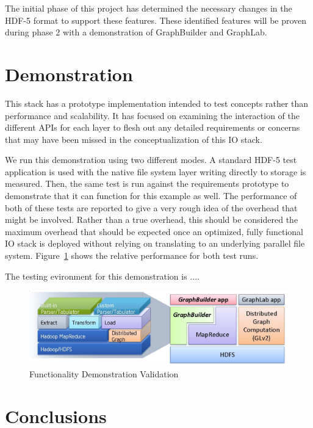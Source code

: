 \documentclass[conference]{IEEEtran}
\begin{document}
The initial phase of this project has determined the necessary changes in the
HDF-5 format to support these features. These identified features will be
proven during phase 2 with a demonstration of GraphBuilder and GraphLab.

\section{Demonstration}
\label{sec:evaluation}

This stack has a prototype implementation intended to test concepts rather
than performance and scalability. It has focused on examining the interaction
of the different APIs for each layer to flesh out any detailed requirements
or concerns that may have been missed in the conceptualization of this IO stack.

We run this demonstration using two different modes. A standard HDF-5 test
application is used with the native file system layer writing directly to
storage is measured. Then, the same test is run against the requirements
prototype to demonstrate that it can function for this example as well. The
performance of both of these tests are reported to give a very rough idea of
the overhead that might be involved. Rather than a true overhead, this should
be considered the maximum overhead that should be expected once an optimized,
fully functional IO stack is deployed without relying on translating to an
underlying parallel file system. Figure~\ref{fig:evaluation} shows the
relative performance for both test runs.

The testing evironment for this demonstration is ....

\begin{figure}[htbp]
\centering
\includegraphics[width=\columnwidth]{images/graphlab-and-graphbuilder.png}
\caption{Functionality Demonstration Validation}
\label{fig:evaluation}
\end{figure}

\section{Conclusions}
\label{sec:conclusion}
\end{document}
